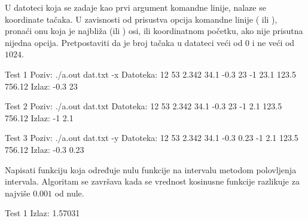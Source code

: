 \begin{Answer}[ref=404]
\end{Answer}
\begin{Exercise}[label=405]
  U datoteci koja se zadaje kao prvi argument komandne linije, nalaze
  se koordinate tačaka. U zavisnosti od prisustva opcija komandne
  linije ( ili ), pronaći onu koja je najbliža
   (ili ) osi, ili koordinatnom početku, ako nije
  prisutna nijedna opcija. Pretpostaviti da je broj tačaka u datateci
  veći od $0$ i ne veći od $1024$.
  
\begin{minitest}
\begin{test}{Test 1}
Poziv: ./a.out dat.txt -x
Datoteka:
  12 53
  2.342 34.1
  -0.3 23
  -1 23.1
  123.5 756.12
Izlaz:
  -0.3 23
\end{test}
\end{minitest}
\begin{minitest}
\begin{test}{Test 2}
Poziv: ./a.out dat.txt 
Datoteka:
  12 53
  2.342 34.1
  -0.3 23
  -1 2.1
  123.5 756.12
Izlaz:
  -1 2.1
\end{test}
\end{minitest}
\begin{minitest}
\begin{test}{Test 3}
Poziv: ./a.out dat.txt -y
Datoteka:
  12 53
  2.342 34.1
  -0.3 0.23
  -1 2.1
  123.5 756.12
Izlaz:
  -0.3 0.23
\end{test}
\end{minitest}


\end{Exercise}

\begin{Answer}[ref=405]
\end{Answer}
\begin{Exercise}[label=406]
  Napisati funkciju koja određuje nulu funkcije  na
  intervalu \argf{[0,2]} metodom polovljenja intervala. Algoritam se
  završava kada se vrednost kosinusne funkcije razlikuje za najviše
  $0.001$ od nule. 
  
\begin{minitest}
\begin{test}{Test 1}
Izlaz:
  1.57031
\end{test}
\end{minitest}


\end{Exercise}

